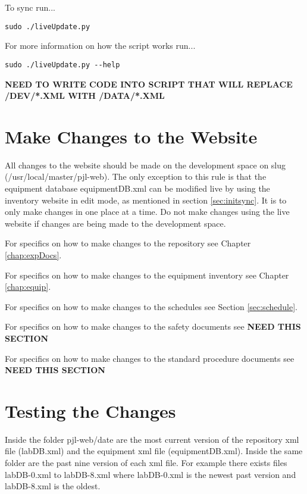 \documentclass[justified]{pjlProcessDocs}
\begin{document}
\noindent To sync run...
\begin{lstlisting}[backgroundcolor = \color{light-gray}]
sudo ./liveUpdate.py
\end{lstlisting}
\vspace{-1em}
\noindent For more information on how the script works run...

\begin{lstlisting}[backgroundcolor = \color{light-gray}]
sudo ./liveUpdate.py --help
\end{lstlisting}

{\bf NEED TO WRITE CODE INTO SCRIPT THAT WILL REPLACE /DEV/*.XML WITH /DATA/*.XML}

\section{Make Changes to the Website}\label{sec:makeChanges}

All changes to the website should be made on the development space on slug (/usr/local/master/pjl-web). The only exception to this rule is that the equipment database equipmentDB.xml can be modified live by using the inventory website in edit mode, as mentioned in section \ref{sec:initsync}. It is to only make changes in one place at a time. Do not make changes using the live website if changes are being made to the development space. 

For specifics on how to make changes to the repository see Chapter \ref{chap:expDocs}.

For specifics on how to make changes to the equipment inventory see Chapter \ref{chap:equip}.

For specifics on how to make changes to the schedules see Section \ref{sec:schedule}.

For specifics on how to make changes to the safety documents see {\bf NEED THIS SECTION}

For specifics on how to make changes to the standard procedure documents see {\bf NEED THIS SECTION}

\section{Testing the Changes}\label{sec:testingChanges}

Inside the folder pjl-web/date are the most current version of the repository xml file (labDB.xml) and the equipment xml file (equipmentDB.xml). Inside the same folder are the past nine version of each xml file. For example there exists files labDB-0.xml to labDB-8.xml where labDB-0.xml is the newest past version and labDB-8.xml is the oldest. 
\end{document}
